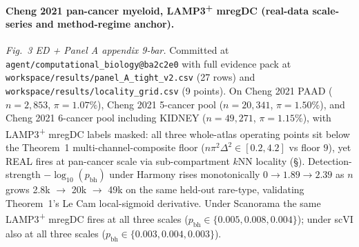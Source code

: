 %

\paragraph{Cheng 2021 pan-cancer myeloid, LAMP3\textsuperscript{+} mregDC (real-data scale-series and method-regime anchor).} \emph{Fig.~3 ED + Panel A appendix 9-bar.} Committed at \texttt{agent/computational\_biology@ba2c2e0} with full evidence pack at \texttt{workspace/results/panel\_A\_tight\_v2.csv} (27 rows) and \texttt{workspace/results/locality\_grid.csv} (9 points). On Cheng 2021 PAAD ($n=2{,}853$, $\pi=1.07\%$), Cheng 2021 5-cancer pool ($n=20{,}341$, $\pi=1.50\%$), and Cheng 2021 6-cancer pool including KIDNEY ($n=49{,}271$, $\pi=1.15\%$), with LAMP3\textsuperscript{+} mregDC labels masked: all three whole-atlas operating points sit below the Theorem~1 multi-channel-composite floor ($n\pi^2\Delta^2 \in [0.2, 4.2]$ vs floor $9$), yet REAL fires at pan-cancer scale via sub-compartment $k$NN locality (§). Detection-strength $-\log_{10}(p_{\mathrm{bh}})$ under Harmony rises monotonically $0 \to 1.89 \to 2.39$ as $n$ grows 2.8k $\to$ 20k $\to$ 49k on the same held-out rare-type, validating Theorem~1's Le Cam local-sigmoid derivative. Under Scanorama the same LAMP3\textsuperscript{+} mregDC fires at all three scales ($p_{\mathrm{bh}} \in \{0.005, 0.008, 0.004\}$); under scVI also at all three scales ($p_{\mathrm{bh}} \in \{0.003, 0.004, 0.003\}$).

